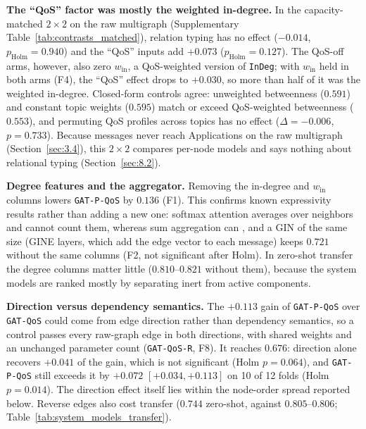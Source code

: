 \noindent\textbf{The ``QoS'' factor was mostly the weighted in-degree.} In the capacity-matched $2\times2$ on the raw multigraph (Supplementary Table~\ref{tab:contrasts_matched}), relation typing has no effect ($-0.014$, $p_{\text{Holm}} = 0.940$) and the ``QoS'' inputs add $+0.073$ ($p_{\text{Holm}} = 0.127$). The QoS-off arms, however, also zero $w_{\text{in}}$, a QoS-weighted version of \texttt{InDeg}; with $w_{\text{in}}$ held in both arms (F4), the ``QoS'' effect drops to $+0.030$, so more than half of it was the weighted in-degree. Closed-form controls agree: unweighted betweenness ($0.591$) and constant topic weights ($0.595$) match or exceed QoS-weighted betweenness ($0.553$), and permuting QoS profiles across topics has no effect ($\Delta = -0.006$, $p = 0.733$). Because messages never reach Applications on the raw multigraph (Section~\ref{sec:3.4}), this $2\times2$ compares per-node models and says nothing about relational typing (Section~\ref{sec:8.2}).

\noindent\textbf{Degree features and the aggregator.} Removing the in-degree and $w_{\text{in}}$ columns lowers \texttt{GAT-P-QoS} by $0.136$ (F1). This confirms known expressivity results rather than adding a new one: softmax attention averages over neighbors and cannot count them, whereas sum aggregation can \cite{xu2019gin,corso2020pna}, and a GIN of the same size (GINE layers, which add the edge vector to each message) keeps $0.721$ without the same columns (F2, not significant after Holm). In zero-shot transfer the degree columns matter little ($0.810$--$0.821$ without them), because the system models are ranked mostly by separating inert from active components.

\noindent\textbf{Direction versus dependency semantics.} The $+0.113$ gain of \texttt{GAT-P-QoS} over \texttt{GAT-QoS} could come from edge direction rather than dependency semantics, so a control passes every raw-graph edge in both directions, with shared weights and an unchanged parameter count (\texttt{GAT-QoS-R}, F8). It reaches $0.676$: direction alone recovers $+0.041$ of the gain, which is not significant (Holm $p = 0.064$), and \texttt{GAT-P-QoS} still exceeds it by $+0.072$ $[+0.034, +0.113]$ on 10 of 12 folds (Holm $p = 0.014$). The direction effect itself lies within the node-order spread reported below. Reverse edges also cost transfer ($0.744$ zero-shot, against $0.805$--$0.806$; Table~\ref{tab:system_models_transfer}).

